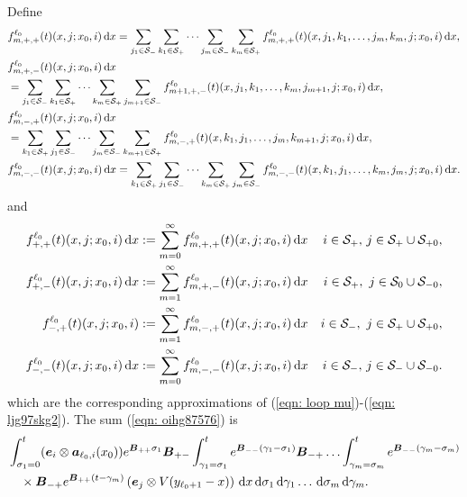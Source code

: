 Define
\begin{align}
	&f_{m,+,+}^{\ell_0}(t)(x,j;x_0,i) \, \mathrm{d} x = \sum_{j_1\in\mathcal S_-} \sum_{k_1\in\mathcal S_+}\dots \sum_{j_m\in\mathcal S_-}\sum_{k_m\in\mathcal S_+} f_{m,+,+}^{\ell_0}(t)(x, j_1,k_1,\dots,j_m,k_m, j; x_0,i) \, \mathrm{d} x,\label{eqn: oihg87576}
	\\&f^{\ell_0}_{m,+,-}(t)(x, j; x_0,i) \, \mathrm{d} x \nonumber
	\\&= \sum_{j_1\in\mathcal S_-} \sum_{k_1\in\mathcal S_+}\dots \sum_{k_m\in\mathcal S_+}\sum_{j_{m+1}\in\mathcal S_-}f^{\ell_0}_{m+1,+,-}(t)(x, j_1,k_1,\dots,k_m,j_{m+1}, j; x_0,i) \, \mathrm{d} x,
	\\&f^{\ell_0}_{m,-,+}(t)(x, j; x_0,i) \, \mathrm{d} x \nonumber
	\\&= \sum_{k_1\in\mathcal S_+} \sum_{j_1\in\mathcal S_-}\dots \sum_{j_m\in\mathcal S_-}\sum_{k_{m+1}\in\mathcal S_+}f^{\ell_0}_{m,-,+}(t)(x, k_1,j_1,\dots,j_m,k_{m+1}, j; x_0,i)  \, \mathrm{d} x,
	\\&f^{\ell_0}_{m,-,-}(t)(x, j; x_0,i) \, \mathrm{d} x = \sum_{k_1\in\mathcal S_+} \sum_{j_1\in\mathcal S_-}\dots \sum_{k_m\in\mathcal S_+}\sum_{j_m\in\mathcal S_-}f^{\ell_0}_{m,-,-}(t)(x, k_1, j_1,\dots,k_m,j_m, j; x_0,i) \, \mathrm{d} x.  \label{eqn: many eqns}
\end{align}
and
\begin{align*}
		f^{\ell_0}_{+,+}(t)(x,j;x_0,i)\, \mathrm{d} x &:= \sum_{m=0}^\infty f^{\ell_0}_{m,+,+}(t)(x,j;x_0,i)\, \mathrm{d} x & i\in\mathcal{S}_+,\,j\in\mathcal{S}_+\cup\mathcal{S}_{+0},
		\\ f^{\ell_0}_{+,-}(t)(x,j;x_0,i)\, \mathrm{d} x &:= \sum_{m=1}^\infty f^{\ell_0}_{m,+,-}(t)(x,j;x_0,i)\, \mathrm{d} x & i\in\mathcal S_+,\,\,j\in\mathcal S_{0}\cup\mathcal{S}_{-0},
		\\ f^{\ell_0}_{-,+}(t)(x,j;x_0,i) &:= \sum_{m=1}^\infty f^{\ell_0}_{m,-,+}(t)(x,j;x_0,i)\, \mathrm{d} x & i\in\mathcal S_-,\,\,j\in\mathcal S_{+}\cup\mathcal{S}_{+0},
		\\ f^{\ell_0}_{-,-}(t)(x,j;x_0,i)\, \mathrm{d} x &:= \sum_{m=0}^\infty f^{\ell_0}_{m,-,-}(t)(x,j;x_0,i)\, \mathrm{d} x & i\in\mathcal{S}_-,\,j\in\mathcal S_-\cup\mathcal{S}_{-0}.
\end{align*}
which are the corresponding approximations of (\ref{eqn: loop mu})-(\ref{eqn: ljg97skg2}).
The sum (\ref{eqn: oihg87576}) is 
\begin{align}
	&\int_{\sigma_1=0}^t (\boldsymbol e_i\otimes \boldsymbol  a_{\ell_0,i}(x_0)) e^{\boldsymbol{B}_{++}\sigma_1}\boldsymbol{B}_{+-}	\nonumber
	\int_{\gamma_1=\sigma_1}^{t} e^{\boldsymbol{B}_{--}(\gamma_1-\sigma_1)}\boldsymbol{B}_{-+}
	\hdots 
	 \int_{\gamma_m=\sigma_{m}}^{t} e^{\boldsymbol{B}_{--}(\gamma_m-\sigma_{m})}\\&\quad\times\boldsymbol{B}_{-+}
	e^{\boldsymbol{B}_{++}(t-\gamma_m)}\left(\boldsymbol e_j \otimes V(y_{\ell_0+1}-x)\right)\, \mathrm{d} x
	\, \mathrm{d} \sigma_1\, \mathrm{d} \gamma_1\dots \, \mathrm{d} \sigma_m\, \mathrm{d} \gamma_m. \label{eqn: looper}
\end{align}
